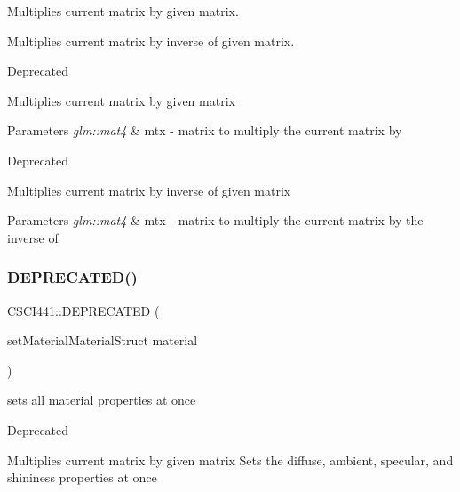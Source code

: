 Multiplies current matrix by given matrix. 

Multiplies current matrix by inverse of given matrix.

\begin{DoxyRefDesc}{Deprecated}
\item[\hyperlink{deprecated__deprecated000001}{Deprecated}]Multiplies current matrix by given matrix \end{DoxyRefDesc}

\begin{DoxyParams}{Parameters}
{\em glm\+::mat4} & mtx -\/ matrix to multiply the current matrix by\\
\hline
\end{DoxyParams}
\begin{DoxyRefDesc}{Deprecated}
\item[\hyperlink{deprecated__deprecated000002}{Deprecated}]Multiplies current matrix by inverse of given matrix \end{DoxyRefDesc}

\begin{DoxyParams}{Parameters}
{\em glm\+::mat4} & mtx -\/ matrix to multiply the current matrix by the inverse of \\
\hline
\end{DoxyParams}
\mbox{\label{namespace_c_s_c_i441_a1b02a3d2b9323127b811be893d7a63e1}} 
\subsubsection{\texorpdfstring{D\+E\+P\+R\+E\+C\+A\+T\+E\+D()}{DEPRECATED()}\hspace{0.1cm}{\footnotesize\ttfamily [2/2]}}
{\footnotesize\ttfamily C\+S\+C\+I441\+::\+D\+E\+P\+R\+E\+C\+A\+T\+ED (\begin{DoxyParamCaption}\item[{void }]{set\+MaterialMaterial\+Struct material }\end{DoxyParamCaption})}



sets all material properties at once 

\begin{DoxyRefDesc}{Deprecated}
\item[\hyperlink{deprecated__deprecated000003}{Deprecated}]Multiplies current matrix by given matrix Sets the diffuse, ambient, specular, and shininess properties at once\end{DoxyRefDesc}



